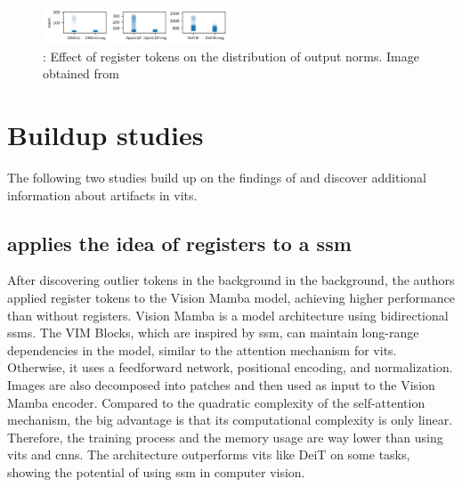 \documentclass[conference]{IEEEtran}
\begin{document}
  \begin{figure}
    \centering
    \includegraphics[width=0.5\textwidth]{figures/register-norm-result.png}
    \caption{: Effect of register tokens on the distribution of output norms. Image obtained from \cite{registers}}
    \label{fig:register-norm-result}
  \end{figure}


  \section{Buildup studies}
  \label{sec:buildup}
  
  The following two studies build up on the findings of \cite{registers} and discover additional information about artifacts in \acp{vit}.

  \subsection{\citeauthor{mamba-needs-registers} applies the idea of registers to a \ac{ssm}}
  \label{sec:buildup:mamba}

  After discovering outlier tokens in the background in the background, the authors applied register tokens to the Vision Mamba model, achieving higher performance than without registers. Vision Mamba \cite{vision-mamba} is a model architecture using bidirectional \acfp{ssm}. The VIM Blocks, which are inspired by \ac{ssm}, can maintain long-range dependencies in the model, similar to the attention mechanism for \acp{vit}. Otherwise, it uses a feedforward network, positional encoding, and normalization. Images are also decomposed into patches and then used as input to the Vision Mamba encoder. Compared to the quadratic complexity of the self-attention mechanism, the big advantage is that its computational complexity is only linear. Therefore, the training process and the memory usage are way lower than using \acp{vit} and \acp{cnn}. The architecture outperforms \acp{vit} like DeiT \cite{deit} on some tasks, showing the potential of using \ac{ssm} in computer vision. \cite{vision-mamba} \cite{mamba-needs-registers}
\end{document}
